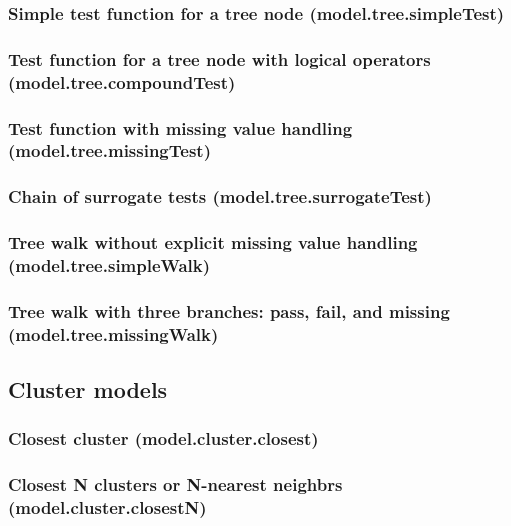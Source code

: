 \documentclass{article}
\theoremstyle{definition}
\begin{document}
\subsubsection{Simple test function for a tree node (model.tree.simpleTest)}

\subsubsection{Test function for a tree node with logical operators (model.tree.compoundTest)}

\subsubsection{Test function with missing value handling (model.tree.missingTest)}

\subsubsection{Chain of surrogate tests (model.tree.surrogateTest)}

\subsubsection{Tree walk without explicit missing value handling (model.tree.simpleWalk)}

\subsubsection{Tree walk with three branches: pass, fail, and missing (model.tree.missingWalk)}

\subsection{Cluster models}

\subsubsection{Closest cluster (model.cluster.closest)}

\subsubsection{Closest N clusters or N-nearest neighbrs (model.cluster.closestN)}
\end{document}
